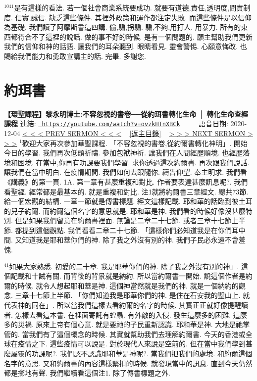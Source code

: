 \documentclass{book}
\begin{document}
$^{1041}$是有這樣的看法.
若一個社會商業系統要成功.
就要有道德,責任,透明度,問責制度.
信實,誠信.
缺乏這些條件.
其裡外政策和運作都注定失敗.
而這些條件是以信仰為基礎.
我們讀了阿摩斯書這四講.
偷,騙,拐騙.
騙,不夠,用打人.
用暴力.
所有的東西都符合不了這裡的說話.
做的事不好的時候.
是有一個問題的.
願主幫助我們更新我們的信仰和神的話語.
讓我們的耳朵聽到.
眼睛看見.
靈會警惕.
心願意悔改.
也賜給我們能力和勇敢宣講主的話.
完畢.
多謝您.
\newpage



\section{約珥書}
\label{sec:ovzkHTnXBCk}
\textbf{【環聖課程】黎永明博士:不容忽視的書卷──從約珥書轉化生命 │ 轉化生命查經課程}
\newline
\newline
連結: \href{https://youtube.com/watch?v=ovzkHTnXBCk}{\texttt{ https://youtube.com/watch?v=ovzkHTnXBCk}} ~~~~ 語音日期: 2020-12-04 
\newline
\newline
\hyperref[sec:s7QrDPLqvfM]{\small{< < < PREV SERMON < < <}}
~
\hyperref[sec:index]{\small{[返主目錄]}}
~
\hyperref[sec:kGnhU90Nb7o]{\small{> > > NEXT SERMON > > >}}
\newline
\newline
$^{1}$歡迎大家再次參加華聖課程.
「不容忽視的書卷,從約爾書轉化神明」.
開始今日的學習.
我們再次低頭祈禱.
參加包袱神祈.
讓我們在人間經歷順境.
也經歷落境和困境.
在當中,你再有功課要我們學習.
求你透過這次約爾書.
再次跟我們說話.
讓我們在當中明白.
在疫情期間.
我們如何去跟隨你.
禱告仰望.
奉主明求.
我們看《講義》的第一頁.
1A.
第一章有甚麼重複和對比.
作者要表達甚麼訊息呢?.
我們看聖經.
經常都是最基本的.
就是重複和對比.
注1就將約爾書三章經文.
總共73節.
給一個宏觀的結構.
一章一節就是傳書標題.
經文這樣記載.
耶和華的話臨到彼土耳的兒子約爾.
而約爾這個名字的意思就是.
耶和華是神.
我們看的時候好像沒甚麼特別.
但是如果我們留意在約爾書裡面.
無論是二章二十七節.
或者三章十七節上半節.
都提到這個觀點.
我們看看二章二十七節.
「這樣你們必知道我是在你們耳中間.
又知道我是耶和華你們的神.
除了我之外沒有別的神.
我們子民必永遠不會羞愧.

$^{41}$如果大家熟悉.
初愛的二十章.
我是耶華你們的神.
除了我之外沒有別的神」.
這個記載和十誡有關.
而背後的背景就是納約.
所以當約爾書一開始.
說這個作者是約爾的時候.
就令人想起耶和華是神.
這個神當然就是我們的神.
就是一個納約的觀念.
三章十七節上半節.
「你們知道我是耶華你們的神.
是住在石安我的聖山上.
就代表神的同在」.
所以當我們這樣去看約爾的名字的時候.
其實正正就好像提醒讀者.
怎樣去看這本書.
在裡面寄託有蝗蟲.
有外敵的入侵.
發生這麼多的困難.
這麼多的災禍.
原來上帝有個心意.
就是要祂的子民重新認識.
耶和華是神.
大地是祂掌管的.
當我們有了這個概念的時候.
其實就幫助我們去理解約爾書.
今天的香港或全球在疫情之下.
這些疫情可以說是.
對於現代人來說是空前的.
但在當中我們學到甚麼屬靈的功課呢?.
我們認不認識耶和華是神呢?.
當我們把我們的處境.
和約爾這個名字的意思.
又和約爾書的內容這樣緊扣的時候.
就發現當中的訊息.
直到今天仍然都是擲地有聲.
我們繼續看這個注1.
除了傳書標題之外.
\end{document}
